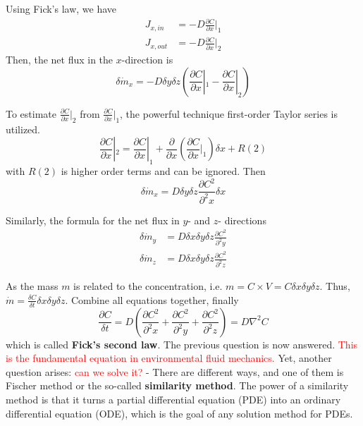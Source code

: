 Using Fick's law, we have
\begin{equation}
  \label{eq:178}
  \begin{split}
    J_{x,in} &= -D\frac{\partial C}{\partial x}|_1\\
    J_{x,out} &= -D\frac{\partial C}{\partial x}|_2
  \end{split}
\end{equation}
Then, the net flux in the $x$-direction is
\begin{equation}
  \label{eq:180}
  \delta \dot{m}_x = - D\delta y \delta z \left( \frac{\partial
      C}{\partial x}|_1 - \frac{\partial C}{\partial x}|_2 \right)
\end{equation}

To estimate $ \frac{\partial C}{\partial x}|_2$ from $
\frac{\partial C}{\partial x}|_1$, the powerful technique first-order
Taylor series is utilized.
\begin{equation}
  \label{eq:181}
   \frac{\partial C}{\partial x}|_2 =  \frac{\partial C}{\partial
     x}|_1 + \frac{\partial}{\partial x}(\frac{\partial C}{\partial
     x}|_1)\delta x + R(2)
\end{equation}
with $R(2)$ is higher order terms and can be ignored. Then
\begin{equation}
  \label{eq:182}
  \delta \dot{m}_x =  D\delta y \delta z \frac{\partial
    C^2}{\partial^2 x} \delta x 
\end{equation}

Similarly, the formula for the net flux in $y$- and $z$- directions
\begin{equation}
  \label{eq:183}
  \begin{split}
    \delta \dot{m}_y &= D \delta x \delta y \delta z \frac{\partial
    C^2}{\partial^2 y}  \\
    \delta \dot{m}_z &= D \delta x \delta y \delta z \frac{\partial
    C^2}{\partial^2 z}  
  \end{split}
\end{equation}

As the mass $m$ is related to the concentration, i.e. $m=C\times
V=C\delta x\delta y\delta z$. Thus, $\dot{m} = \frac{\delta
  C}{\delta
  t}
\delta x \delta y \delta z$. Combine all equations together, finally
\begin{equation}
  \label{eq:184}
  \frac{\partial C}{\delta t} = D(\frac{\partial C^2}{\partial^2x} +
  \frac{\partial C^2}{\partial^2y} + \frac{\partial C^2}{\partial^2z}
  ) = D\nabla^2 C
\end{equation}
which is called {\bf Fick's second law}.  The previous question is now
answered.
\textcolor{red}{This is the fundamental equation in environmental
  fluid mechanics.}
Yet, another question arises: \textcolor{red}{can we solve it?} -
There are different ways, and one of them is Fischer method or the
so-called {\bf similarity method}.  The power of a similarity method
is that it turns a partial differential equation (PDE) into an
ordinary differential equation (ODE), which is the goal of any
solution method for PDEs.

